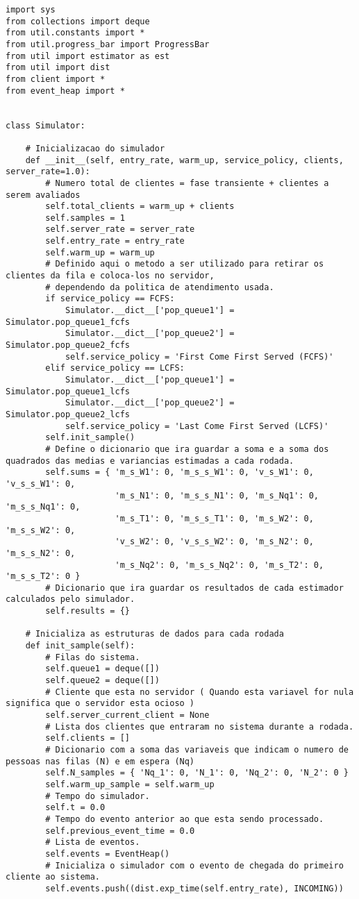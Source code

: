 \begin{lstlisting}
import sys
from collections import deque
from util.constants import *
from util.progress_bar import ProgressBar
from util import estimator as est
from util import dist
from client import *
from event_heap import *


class Simulator:

    # Inicializacao do simulador
    def __init__(self, entry_rate, warm_up, service_policy, clients, server_rate=1.0):
        # Numero total de clientes = fase transiente + clientes a serem avaliados 
        self.total_clients = warm_up + clients
        self.samples = 1
        self.server_rate = server_rate
        self.entry_rate = entry_rate
        self.warm_up = warm_up
        # Definido aqui o metodo a ser utilizado para retirar os clientes da fila e coloca-los no servidor,
        # dependendo da politica de atendimento usada.
        if service_policy == FCFS:
            Simulator.__dict__['pop_queue1'] = Simulator.pop_queue1_fcfs
            Simulator.__dict__['pop_queue2'] = Simulator.pop_queue2_fcfs
            self.service_policy = 'First Come First Served (FCFS)'
        elif service_policy == LCFS:
            Simulator.__dict__['pop_queue1'] = Simulator.pop_queue1_lcfs
            Simulator.__dict__['pop_queue2'] = Simulator.pop_queue2_lcfs
            self.service_policy = 'Last Come First Served (LCFS)'
        self.init_sample()
        # Define o dicionario que ira guardar a soma e a soma dos quadrados das medias e variancias estimadas a cada rodada.
        self.sums = { 'm_s_W1': 0, 'm_s_s_W1': 0, 'v_s_W1': 0, 'v_s_s_W1': 0,            
                      'm_s_N1': 0, 'm_s_s_N1': 0, 'm_s_Nq1': 0, 'm_s_s_Nq1': 0,            
                      'm_s_T1': 0, 'm_s_s_T1': 0, 'm_s_W2': 0, 'm_s_s_W2': 0,            
                      'v_s_W2': 0, 'v_s_s_W2': 0, 'm_s_N2': 0, 'm_s_s_N2': 0,
                      'm_s_Nq2': 0, 'm_s_s_Nq2': 0, 'm_s_T2': 0, 'm_s_s_T2': 0 }
        # Dicionario que ira guardar os resultados de cada estimador calculados pelo simulador.
        self.results = {}
    
    # Inicializa as estruturas de dados para cada rodada
    def init_sample(self):
        # Filas do sistema.
        self.queue1 = deque([])
        self.queue2 = deque([])
        # Cliente que esta no servidor ( Quando esta variavel for nula significa que o servidor esta ocioso )
        self.server_current_client = None
        # Lista dos clientes que entraram no sistema durante a rodada.
        self.clients = []
        # Dicionario com a soma das variaveis que indicam o numero de pessoas nas filas (N) e em espera (Nq)
        self.N_samples = { 'Nq_1': 0, 'N_1': 0, 'Nq_2': 0, 'N_2': 0 }
        self.warm_up_sample = self.warm_up
        # Tempo do simulador.
        self.t = 0.0
        # Tempo do evento anterior ao que esta sendo processado.
        self.previous_event_time = 0.0
        # Lista de eventos.
        self.events = EventHeap()
        # Inicializa o simulador com o evento de chegada do primeiro cliente ao sistema.
        self.events.push((dist.exp_time(self.entry_rate), INCOMING))
    

\end{lstlisting}
